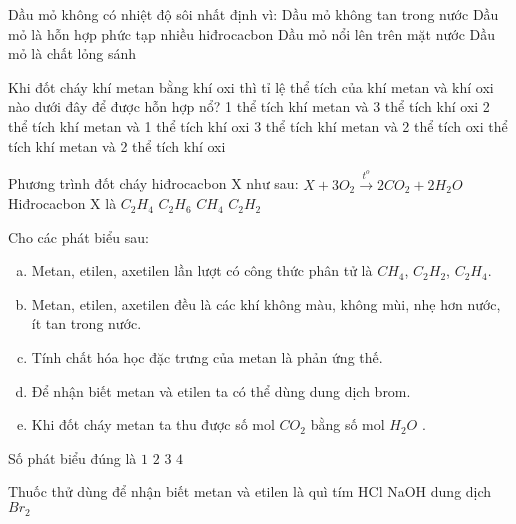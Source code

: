 \begin{ex}
	Dầu mỏ không có nhiệt độ sôi nhất định vì:
	\choice
	{Dầu mỏ không tan trong nước}
	{\True Dầu mỏ là hỗn hợp phức tạp nhiều hiđrocacbon}
	{Dầu mỏ nổi lên trên mặt nước}
	{Dầu mỏ là chất lỏng sánh}
	\loigiai{}
\end{ex}
\begin{ex}
	Khi đốt cháy khí metan bằng khí oxi thì tỉ lệ thể tích của khí metan và khí oxi nào dưới đây để được hỗn hợp nổ?
	\choice
	{1 thể tích khí metan và 3 thể tích khí oxi}
	{2 thể tích khí metan và 1 thể tích khí oxi}
	{3 thể tích khí metan và 2 thể tích oxi}
	{ thể tích khí metan và 2 thể tích khí oxi}
	\loigiai{}
\end{ex}
\begin{ex}
	Phương trình đốt cháy hiđrocacbon X như sau: $X+3O_2 \stackrel{t^o}{\to}2CO_2+2H_2 O$
	Hiđrocacbon X là
	\choice
	{\True $C_2H_4$}
	{$C_2H_6$}
	{$CH_4$}
	{$C_2H_2$}
	\loigiai{}
\end{ex}
\begin{ex}
	Cho các phát biểu sau:
	\begin{enumerate}[(a)]
		\item  Metan, etilen, axetilen lần lượt có công thức phân tử là $CH_4$, $C_2H_2$, $C_2H_4$.
		\item  Metan, etilen, axetilen đều là các khí không màu, không mùi, nhẹ hơn nước, ít tan trong nước.
		\item  Tính chất hóa học đặc trưng của metan là phản ứng thế.
		\item  Để nhận biết metan và etilen ta có thể dùng dung dịch brom.
		\item  Khi đốt cháy metan ta thu được số mol $CO_2$ bằng số mol  $H_2O$ .
	\end{enumerate}
	Số phát biểu đúng là
	\choice
	{$1$}
	{$2$}
	{\True $3$}
	{$4$}
	\loigiai{}
\end{ex}
\begin{ex}
	Thuốc thử dùng để nhận biết metan và etilen là
	\choice
	{quì tím}
	{HCl}
	{NaOH}
	{\True dung dịch $Br_2$}
	\loigiai{}
\end{ex}
